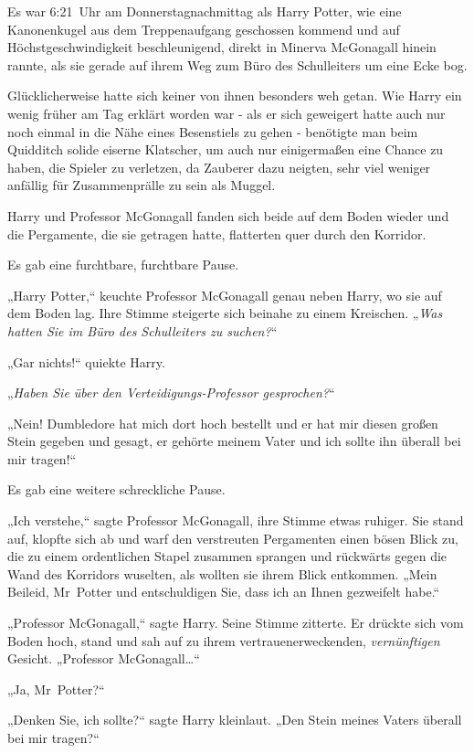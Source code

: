 {Es war 6:21~Uhr am Donnerstagnachmittag als Harry Potter, wie eine Kanonenkugel aus dem Treppenaufgang geschossen kommend und auf Höchstgeschwindigkeit beschleunigend, direkt in Minerva McGonagall hinein rannte, als sie gerade auf ihrem Weg zum Büro des Schulleiters um eine Ecke bog.

Glücklicherweise hatte sich keiner von ihnen besonders weh getan. Wie Harry ein wenig früher am Tag erklärt worden war - als er sich geweigert hatte auch nur noch einmal in die Nähe eines Besenstiels zu gehen - benötigte man beim Quidditch solide eiserne Klatscher, um auch nur einigermaßen eine Chance zu haben, die Spieler zu verletzen, da Zauberer dazu neigten, sehr viel weniger anfällig für Zusammenprälle zu sein als Muggel.

Harry und Professor McGonagall fanden sich beide auf dem Boden wieder und die Pergamente, die sie getragen hatte, flatterten quer durch den Korridor.

Es gab eine furchtbare, furchtbare Pause.

„Harry Potter,“ keuchte Professor McGonagall genau neben Harry, wo sie auf dem Boden lag. Ihre Stimme steigerte sich beinahe zu einem Kreischen. „\emph{Was hatten Sie im Büro des Schulleiters zu suchen?}“

„Gar nichts!“ quiekte Harry.

„\emph{Haben Sie über den Verteidigungs-Professor gesprochen?}“

„Nein! Dumbledore hat mich dort hoch bestellt und er hat mir diesen großen Stein gegeben und gesagt, er gehörte meinem Vater und ich sollte ihn überall bei mir tragen!“

Es gab eine weitere schreckliche Pause.

„Ich verstehe,“ sagte Professor McGonagall, ihre Stimme etwas ruhiger. Sie stand auf, klopfte sich ab und warf den verstreuten Pergamenten einen bösen Blick zu, die zu einem ordentlichen Stapel zusammen sprangen und rückwärts gegen die Wand des Korridors wuselten, als wollten sie ihrem Blick entkommen. „Mein Beileid, Mr~Potter und entschuldigen Sie, dass ich an Ihnen gezweifelt habe.“

„Professor McGonagall,“ sagte Harry. Seine Stimme zitterte. Er drückte sich vom Boden hoch, stand und sah auf zu ihrem vertrauenerweckenden, \emph{vernünftigen} Gesicht. „Professor McGonagall…“

„Ja, Mr~Potter?“

„Denken Sie, ich sollte?“ sagte Harry kleinlaut. „Den Stein meines Vaters überall bei mir tragen?“

}
